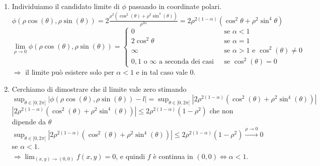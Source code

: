 \documentclass{article}
\begin{document}
\begin{enumerate}
    \item Individuiamo il candidato limite di $\phi$ passando in coordinate polari.\\
    $\phi(\rho\cos(\theta),\rho\sin(\theta))=2\frac{\rho^2(\cos^2(\theta)+\rho^2\sin^4(\theta))}{\rho^{2\alpha}}=2\rho^{2(1-\alpha)}(\cos^2\theta+\rho^2\sin^4\theta)$
    \begin{equation*}
        \lim_{\rho\rightarrow0}\phi(\rho\cos(\theta),\rho\sin(\theta))=\begin{cases}
            0&\text{  se  }\alpha<1\\
            2\cos^2\theta&\text{  se  }\alpha=1\\
            \infty&\text{  se  }\alpha>1\text{  e  }\cos^2(\theta)\neq 0\\
            0,1\text{  o  }\infty\text{  a seconda dei casi  }&\text{  se  }\cos^2(\theta)=0
        \end{cases}
    \end{equation*}
    $\Rightarrow$ il limite può esistere solo per $\alpha< 1$ e in tal caso vale $0$.
    \item Cerchiamo di dimostrare che il limite vale zero stimando\\
    $\sup_{\theta \in[0,2\pi[}|\phi(\rho\cos(\theta),\rho\sin(\theta))-l|=\sup_{\theta \in[0,2\pi[}|2\rho^{2(1-\alpha)}(\cos^2(\theta)+\rho^2\sin^4(\theta))|$\\
    $|2\rho^{2(1-\alpha)}(\cos^2(\theta)+\rho^2\sin^4(\theta))|\leq 2\rho^{2(1-\alpha)}(1-\rho^2)$ che non dipende da $\theta$\\
    $\sup_{\theta \in[0,2\pi[}|2\rho^{2(1-\alpha)}(\cos^2(\theta)+\rho^2\sin^4(\theta))|\leq2\rho^{2(1-\alpha)}(1-\rho^2)\xrightarrow{\rho \rightarrow 0} 0 $ se $\alpha <1$.\\
    $\Rightarrow \lim_{(x,y)\rightarrow(0,0)}f(x,y)=0$, e quindi $f$ è continua in $(0,0)\Leftrightarrow \alpha<1$.
\end{enumerate}
\end{document}
